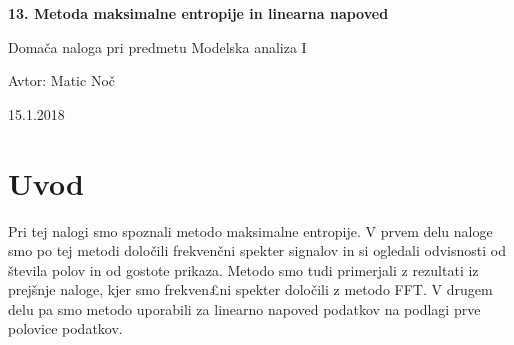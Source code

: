 \documentclass[11pt, a4paper]{article}
\begin{document}
    \begin{center}
    {\LARGE\bfseries 13. Metoda maksimalne entropije in linearna napoved \par}
    \vspace{1cm}
    
    {\Large Domača naloga pri predmetu Modelska analiza I\par}
    \vspace{0.2cm}
    {\normalsize Avtor: Matic Noč \par}
    \vspace{0.2cm}    
    {\normalsize 15.1.2018\par}    

    
    \end{center}
\section{Uvod}
Pri tej nalogi smo spoznali metodo maksimalne entropije. V prvem delu naloge smo po tej metodi določili frekvenčni spekter signalov in si ogledali odvisnosti od števila polov in od gostote prikaza. Metodo smo tudi primerjali z rezultati iz prejšnje naloge, kjer smo frekven£ni spekter določili z metodo FFT. V drugem delu pa smo metodo uporabili za linearno napoved podatkov na podlagi prve polovice podatkov. 
\end{document}
